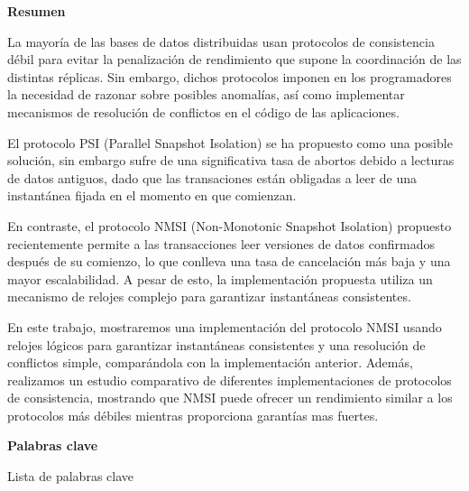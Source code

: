 \newpage

\begin{center}
{\bf \Huge Resumen}
\end{center}

\vspace{1cm}

La mayoría de las bases de datos distribuidas usan protocolos de consistencia débil
para evitar la penalización de rendimiento que supone la coordinación de las distintas
réplicas. Sin embargo, dichos protocolos imponen en los programadores la necesidad de
razonar sobre posibles anomalías, así como implementar mecanismos de resolución de
conflictos en el código de las aplicaciones.

El protocolo PSI (Parallel Snapshot Isolation) se ha propuesto como una posible solución,
sin embargo sufre de una significativa tasa de abortos debido a lecturas de datos antiguos,
dado que las transaciones están obligadas a leer de una instantánea fijada en el momento
en que comienzan.

En contraste, el protocolo NMSI (Non-Monotonic Snapshot Isolation) propuesto recientemente
permite a las transacciones leer versiones de datos confirmados después de su comienzo,
lo que conlleva una tasa de cancelación más baja y una mayor escalabilidad. A pesar de esto,
la implementación propuesta utiliza un mecanismo de relojes complejo para garantizar instantáneas
consistentes.

En este trabajo, mostraremos una implementación del protocolo NMSI usando relojes lógicos
para garantizar instantáneas consistentes y una resolución de conflictos simple, comparándola
con la implementación anterior. Además, realizamos un estudio comparativo de diferentes
implementaciones de protocolos de consistencia, mostrando que NMSI puede ofrecer un rendimiento
similar a los protocolos más débiles mientras proporciona garantías mas fuertes.

\vspace{1cm}

\begin{center}
{\bf \Large Palabras clave}
\end{center}

\vspace{0.5cm}

Lista de palabras clave
